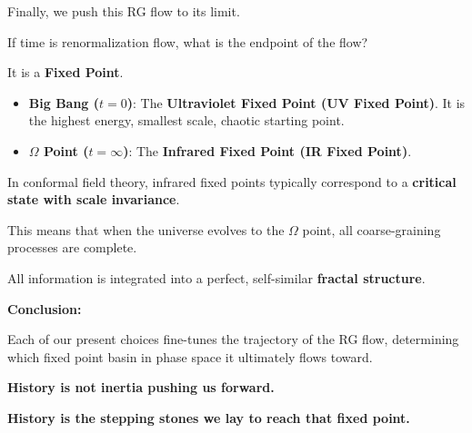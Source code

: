 Finally, we push this RG flow to its limit.

If time is renormalization flow, what is the endpoint of the flow?

It is a \textbf{Fixed Point}.

\begin{itemize}
\item \textbf{Big Bang ($t=0$)}: The \textbf{Ultraviolet Fixed Point (UV Fixed Point)}. It is the highest energy, smallest scale, chaotic starting point.

\item \textbf{$\Omega$ Point ($t=\infty$)}: The \textbf{Infrared Fixed Point (IR Fixed Point)}.
\end{itemize}

In conformal field theory, infrared fixed points typically correspond to a \textbf{critical state with scale invariance}.

This means that when the universe evolves to the $\Omega$ point, all coarse-graining processes are complete.

All information is integrated into a perfect, self-similar \textbf{fractal structure}.

\textbf{Conclusion:}

Each of our present choices fine-tunes the trajectory of the RG flow, determining which fixed point basin in phase space it ultimately flows toward.

\textbf{History is not inertia pushing us forward.}

\textbf{History is the stepping stones we lay to reach that fixed point.}

